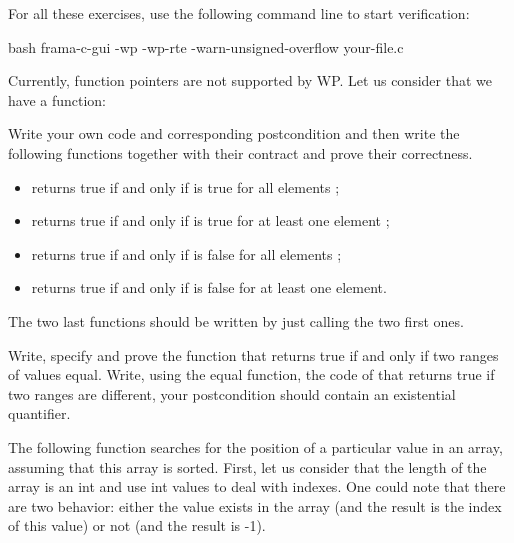 For all these exercises, use the following command line to start verification:

\begin{CodeBlock}{bash}
frama-c-gui -wp -wp-rte -warn-unsigned-overflow your-file.c
\end{CodeBlock}  



Currently, function pointers are not supported by WP. Let us consider that
we have a function:




Write your own code and corresponding postcondition and then write the
following functions together with their contract and prove their correctness.

\begin{itemize}
\item {} returns true if and only if 
  is true for all elements ;
\item {} returns true if and only if 
  is true for at least one element ;
\item {} returns true if and only if 
  is false for all elements ;
\item {} returns true if and only if 
  is false for at least one element.
\end{itemize}

The two last functions should be written by just calling the two first ones.




Write, specify and prove the function  that returns true if
and only if two ranges of values equal. Write, using the equal function, the
code of  that returns true if two ranges are different,
your postcondition should contain an existential quantifier.




\label{l4:statements-loops-ex-bsearch}

The following function searches for the position of a particular value in an
array, assuming that this array is sorted. First, let us consider that the
length of the array is an int and use int values to deal with indexes. One
could note that there are two behavior: either the value exists in the array
(and the result is the index of this value) or not (and the result is -1).


